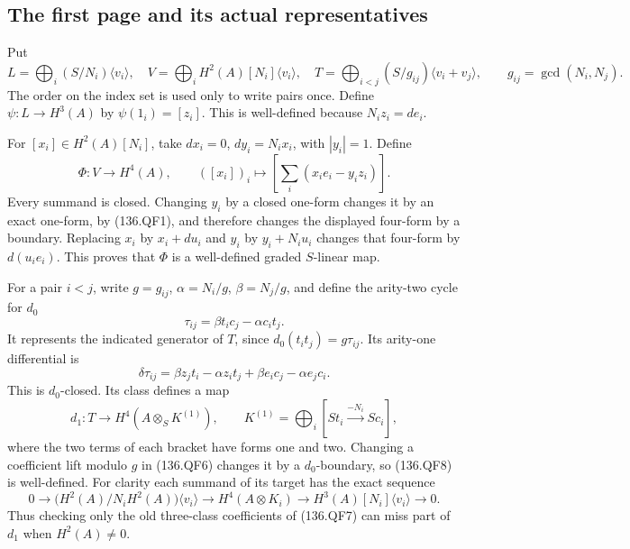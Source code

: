 \subsection{The first page and its actual representatives}

Put
\[
 L=\bigoplus_i(S/N_i)\langle v_i\rangle,\quad
 V=\bigoplus_iH^2(A)[N_i]\langle v_i\rangle,\quad
 T=\bigoplus_{i<j}(S/g_{ij})\langle v_i+v_j\rangle,
 \qquad g_{ij}=\gcd(N_i,N_j).
                                                               \tag{136.QF4}
\]
The order on the index set is used only to write pairs once.
Define \(\psi:L\to H^3(A)\) by
\(\psi(1_i)=[z_i]\).  This is well-defined because
\(N_i z_i=de_i\).

For \([x_i]\in H^2(A)[N_i]\), take
\(dx_i=0\), \(dy_i=N_i x_i\), with \(|y_i|=1\).
Define
\[
 \Phi:V\longrightarrow H^4(A),\qquad
 ([x_i])_i\longmapsto
                   \left[\sum_i(x_i e_i-y_i z_i)\right].
                                                               \tag{136.QF5}
\]
Every summand is closed.  Changing \(y_i\) by a closed
one-form changes it by an exact one-form, by (136.QF1), and
therefore changes the displayed four-form by a boundary.
Replacing \(x_i\) by \(x_i+du_i\) and \(y_i\) by
\(y_i+N_i u_i\) changes that four-form by \(d(u_i e_i)\).
This proves that \(\Phi\) is a well-defined graded
\(S\)-linear map.

For a pair \(i<j\), write
\(g=g_{ij}\), \(\alpha=N_i/g\), \(\beta=N_j/g\),
and define the arity-two cycle for \(d_0\)
\[
                   \tau_{ij}=\beta t_i c_j-\alpha c_i t_j.
                                                               \tag{136.QF6}
\]
It represents the indicated generator of \(T\), since
\(d_0(t_i t_j)=g\tau_{ij}\).  Its arity-one differential is
\[
 \delta\tau_{ij}
       =\beta z_jt_i-\alpha z_it_j
                         +\beta e_ic_j-\alpha e_jc_i.
                                                               \tag{136.QF7}
\]
This is \(d_0\)-closed.  Its class defines a map
\[
 d_1:T\longrightarrow
       H^4(A\otimes_S K^{(1)}),\qquad
 K^{(1)}=\bigoplus_i[S t_i\xrightarrow{-N_i}S c_i],
                                                               \tag{136.QF8}
\]
where the two terms of each bracket have forms one and two.
Changing a coefficient lift modulo \(g\) in (136.QF6)
changes it by a \(d_0\)-boundary, so (136.QF8) is
well-defined.  For clarity each summand of its target has
the exact sequence
\[
 0\longrightarrow \bigl(H^2(A)/N_iH^2(A)\bigr)\langle v_i\rangle
 \longrightarrow H^4(A\otimes K_i)
 \longrightarrow H^3(A)[N_i]\langle v_i\rangle
 \longrightarrow0.
                                                               \tag{136.QF9}
\]
Thus checking only the old three-class coefficients of
(136.QF7) can miss part of \(d_1\) when \(H^2(A)\ne0\).

